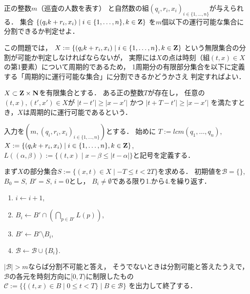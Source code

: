 \begin{timeSpecifiedProblemOnLine}
  正の整数$m$（巡査の人数を表す）
  と自然数の組$(q_i, r_i, x_i)_{ i \in \{ 1, \ldots, n \} }$が与えられる．
  集合
  $\{ (q_i k + r_i, x_i) \mid i \in \{1, \ldots, n\}, k \in \mathbf Z \}$
  を$m$個以下の運行可能な集合に分割できるか判定せよ．
\end{timeSpecifiedProblemOnLine}



この問題では，
$X := \{ (q_i k + r_i, x_i) \mid i \in \{1, \ldots, n\}, k \in \mathbf Z \}$
という無限集合の分割が可能か判定しなければならないが，
実際には$X$の点は時刻（組$(t, x) \in X$の第1要素）について周期的であるため，
1周期分の有限部分集合を以下に定義する「周期的に運行可能な集合」に分割できるかどうかさえ
判定すればよい．


\begin{defi}
  $X \subset \mathbf Z \times \mathbf N$を有限集合とする．
  ある正の整数$T$が存在し，
  任意の$(t, x), (t', x') \in X$が
  $|t - t'| \geq |x - x'|$
  かつ
  $|t + T - t'| \geq |x - x'|$
  を満たすとき，$X$は周期的に運行可能であるという．
\end{defi}



\begin{greedyAlgorithmForTimeSpecifiedProblemOnLine}
  入力を$(m, (q_i, r_i, x_i)_{ i \in \{ 1, \ldots, n \} })$とする．
  始めに
  $T := lcm(q_1, \ldots, q_n)$,
  $X := \{ (q_i k + r_i, x_i) \mid i \in \{1, \ldots, n\}, k \in \mathbf Z \}$,
  $L((\alpha, \beta)) := \{(t, x) \mid x - \beta \leq |t - \alpha| \}$と記号を定義する．

  まず$X$の部分集合$S := \{ (x, t) \in X \mid -T \leq t < 2T \}$を求める．
  初期値を$\mathcal{B} = \{\}$, $B_0 = S$, $B' = S$, $i = 0$とし，
  $B_i \neq \emptyset$である限り1.から4.を繰り返す．
  \begin{enumerate}
    \item $i \gets i + 1$, 
    \item $B_i \gets B' \cap \left( \bigcap_{p \in B'} L(p) \right)$, 
    \item $B' \gets B' \setminus B_i$, 
    \item $\mathcal{B} \gets \mathcal{B} \cup \{ B_i \}$.
  \end{enumerate}

  $|\mathcal{B}| > m$ならば分割不可能と答え，
  そうでないときは分割可能と答えたうえで，
  $\mathcal{B}$の各元を時刻方向に$[0, T)$に制限したもの
  $\mathcal{C} := \{ \{ (t, x) \in B \mid 0 \leq t < T \} \mid B \in \mathcal{B} \}$
  を出力して終了する．
\end{greedyAlgorithmForTimeSpecifiedProblemOnLine}

